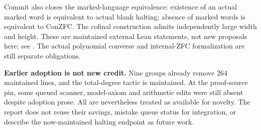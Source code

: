 Commit  also closes the marked-language equivalence: existence of an actual marked word is equivalent to actual blank halting; absence of marked words is equivalent to ConZFC. The cofinal construction admits independently large width and height. These are maintained external Lean statements, not new proposals here; see . The actual polynomial converse and internal-ZFC formalization are still separate obligations.

\textbf{Earlier adoption is not new credit.} Nine groups already remove 264 maintained lines, and the total-degree tactic is maintained. At the proof-source pin, some queued scanner, model-axiom and arithmetic edits were still absent despite adoption prose. All are nevertheless treated as available for novelty. The report does not reuse their savings, mistake queue status for integration, or describe the now-maintained halting endpoint as future work.
